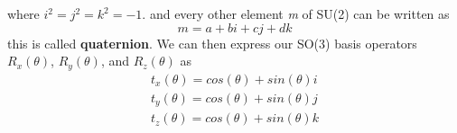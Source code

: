 where $i^2 = j^2 = k^2 = -1$.
and every other element \textit{m} of SU(2) can be written as
\begin{equation}
    m = a + bi + cj + dk
\end{equation}
this is called \textbf{quaternion}.
We can then express our SO(3) basis operators $R_x(\theta)$, $R_y(\theta)$, and $R_z(\theta)$ as
\begin{equation}
    \begin{aligned}
        t_x(\theta) = cos(\theta) + sin(\theta) i \\
        t_y(\theta) = cos(\theta) + sin(\theta) j \\
        t_z(\theta) = cos(\theta) + sin(\theta) k
    \end{aligned}
\end{equation}

